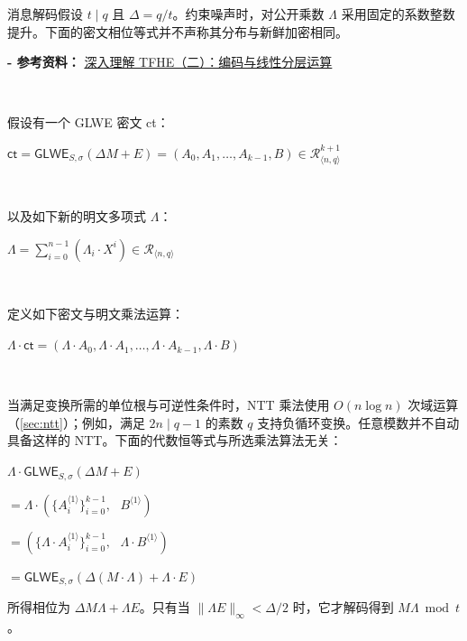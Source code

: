 消息解码假设 $t\mid q$ 且 $\Delta=q/t$。约束噪声时，对公开乘数 $\Lambda$ 采用固定的系数整数提升。下面的密文相位等式并不声称其分布与新鲜加密相同。

\textbf{- 参考资料：}
\href{https://www.zama.ai/post/tfhe-deep-dive-part-2}{深入理解 TFHE（二）：编码与线性分层运算}~\cite{tfhe-2}

$ $

假设有一个 GLWE 密文 \textsf{ct}：

$\textsf{ct} = \textsf{GLWE}_{S, \sigma}(\Delta M + E) = ( A_0, A_1, \ldots, A_{k-1}, B) \in \mathcal{R}_{\langle n,q \rangle}^{k + 1}$

$ $

\noindent 以及如下新的明文多项式 $\Lambda$：

$\Lambda = \sum\limits_{i=0}^{n-1}(\Lambda_i \cdot X^i) \in \mathcal{R}_{\langle n, q \rangle}$

$ $

\noindent 定义如下密文与明文乘法运算：

$\Lambda \cdot \textsf{ct} = (\Lambda \cdot A_0, \Lambda \cdot A_1, \ldots, \Lambda \cdot A_{k-1}, \Lambda \cdot B)$

$ $

\noindent 当满足变换所需的单位根与可逆性条件时，NTT 乘法使用 $O(n\log n)$ 次域运算（\autoref{sec:ntt}）；例如，满足 $2n\mid q-1$ 的素数 $q$ 支持负循环变换。任意模数并不自动具备这样的 NTT。下面的代数恒等式与所选乘法算法无关：

\begin{tcolorbox}[title={\textbf{\tboxlabel{\ref*{sec:glwe-mult-plain}} GLWE 密文与明文的乘法}}]
$\Lambda \cdot \textsf{GLWE}_{S, \sigma}(\Delta M + E)$

$= \Lambda \cdot (\{A_i^{\langle 1 \rangle}\}_{i=0}^{k-1}, \text{ } B^{\langle 1 \rangle})$

$= (\{\Lambda\cdot A_i^{\langle 1 \rangle}\}_{i=0}^{k-1}, \text{ } \Lambda \cdot B^{\langle 1 \rangle})$

$= \textsf{GLWE}_{S, \sigma}(\Delta (M \cdot \Lambda) + \Lambda\cdot E )$
\end{tcolorbox}

所得相位为 $\Delta M\Lambda+\Lambda E$。只有当 $\|\Lambda E\|_\infty<\Delta/2$ 时，它才解码得到 $M\Lambda\bmod t$。

$ $

